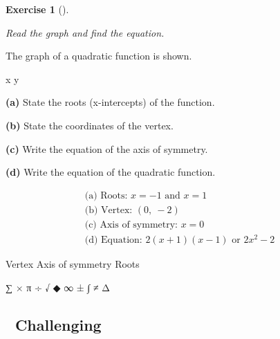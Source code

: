 \documentclass[
  letterpaper,
  DIV=11,
  numbers=noendperiod]{scrreprt}
\theoremstyle{definition}
\newtheorem{exercise}{Exercise}[chapter]
\theoremstyle{remark}
\begin{document}
\begin{exercise}[]\protect\hypertarget{exr-u7-32}{}\label{exr-u7-32}

\emph{Read the graph and find the equation.}

The graph of a quadratic function is shown.

x y

\textbf{(a)} State the roots (x-intercepts) of the function.

\textbf{(b)} State the coordinates of the vertex.

\textbf{(c)} Write the equation of the axis of symmetry.

\textbf{(d)} Write the equation of the quadratic function.

\begin{tcolorbox}[enhanced jigsaw, opacitybacktitle=0.6, coltitle=black, arc=.35mm, colframe=quarto-callout-tip-color-frame, colback=white, bottomrule=.15mm, left=2mm, colbacktitle=quarto-callout-tip-color!10!white, titlerule=0mm, opacityback=0, title=\textcolor{quarto-callout-tip-color}{\faLightbulb}\hspace{0.5em}{🔍 View Solution}, leftrule=.75mm, breakable, rightrule=.15mm, bottomtitle=1mm, toptitle=1mm, toprule=.15mm]

\[
\begin{aligned}
\text{(a) Roots: } x = -1 \text{ and } x = 1 \\[4pt] \text{(b) Vertex: } (0,\ -2) \\[4pt] \text{(c) Axis of symmetry: } x = 0 \\[4pt] \text{(d) Equation: } 2(x + 1)(x - 1) \text{ or } 2x^2 - 2
\end{aligned}
\]

\end{tcolorbox}

{Vertex} {Axis of symmetry} {Roots}

\end{exercise}

∑ × π ÷ √ ◆ ∞ ± ∫ ≠ Δ

\subsection{🔴 Challenging}
\end{document}
